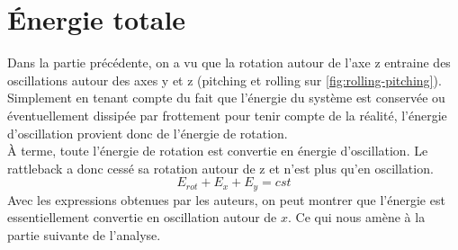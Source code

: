 \documentclass[12pt,a4paper]{article}
\begin{document}
	\section{Énergie totale}
	Dans la partie précédente, on a vu que la rotation autour de l'axe z entraine des oscillations autour des axes y et z (pitching et rolling sur \autoref{fig:rolling-pitching}).\\
	Simplement en tenant compte du fait que l'énergie du système est conservée ou éventuellement dissipée par frottement pour tenir compte de la réalité, l'énergie d'oscillation provient donc de l'énergie de rotation.\\
	À terme, toute l'énergie de rotation est convertie en énergie d'oscillation. Le rattleback a donc cessé sa rotation autour de z et n'est plus qu'en oscillation.
	\begin{equation}
	E_{rot}+E_{x}+E_{y}=cst
	\end{equation}
	Avec les expressions obtenues par les auteurs, on peut montrer que l'énergie est essentiellement convertie en oscillation autour de $x$. Ce qui nous amène à la partie suivante de l'analyse.
\end{document}
